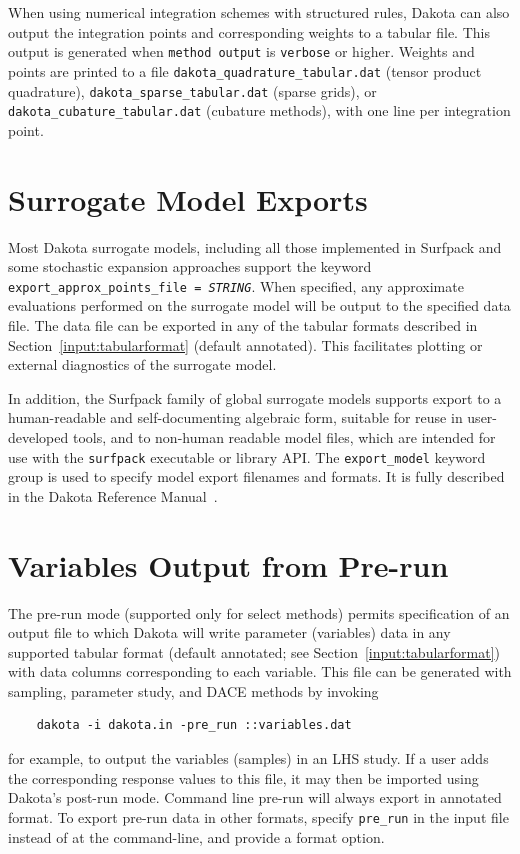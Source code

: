 When using numerical integration schemes with structured rules, Dakota
can also output the integration points and corresponding weights to a
tabular file.  This output is generated when \texttt{method output} is
\texttt{verbose} or higher.  Weights and points are printed to a file
\texttt{dakota\_quadrature\_tabular.dat} (tensor product quadrature),
\texttt{dakota\_sparse\_tabular.dat} (sparse grids), or
\texttt{dakota\_cubature\_tabular.dat} (cubature methods), with one
line per integration point.

\section{Surrogate Model Exports}

Most Dakota surrogate models, including all those implemented in
Surfpack and some stochastic expansion approaches support the keyword
\texttt{export\_approx\_points\_file = \emph{STRING}}.  When specified, any
approximate evaluations performed on the surrogate model will be
output to the specified data file.  The data file can be exported in
any of the tabular formats described in
Section~\ref{input:tabularformat} (default annotated).  This
facilitates plotting or external diagnostics of the surrogate model.

In addition, the Surfpack family of global surrogate models supports
export to a human-readable and self-documenting algebraic form, suitable for 
reuse in user-developed tools, and to non-human readable model files, 
which are intended for use with the {\tt surfpack} executable or library API. 
The \texttt{export\_model} keyword group is used to specify model export filenames 
and formats. It is fully described in the Dakota Reference Manual~\cite{RefMan}.

\section{Variables Output from Pre-run}

The pre-run mode (supported only for select methods) permits
specification of an output file to which Dakota will write parameter
(variables) data in any supported tabular format (default annotated; see
Section~\ref{input:tabularformat}) with data columns corresponding to
each variable.  This file can be generated with sampling, parameter
study, and DACE methods by invoking
\begin{small}
\begin{verbatim}
    dakota -i dakota.in -pre_run ::variables.dat
\end{verbatim}
\end{small}
for example, to output the variables (samples) in an LHS study.  If a
user adds the corresponding response values to this file, it may then
be imported using Dakota's post-run mode.  Command line pre-run will
always export in annotated format.  To export pre-run data in other
formats, specify \texttt{pre\_run} in the input file instead of at the
command-line, and provide a format option.


